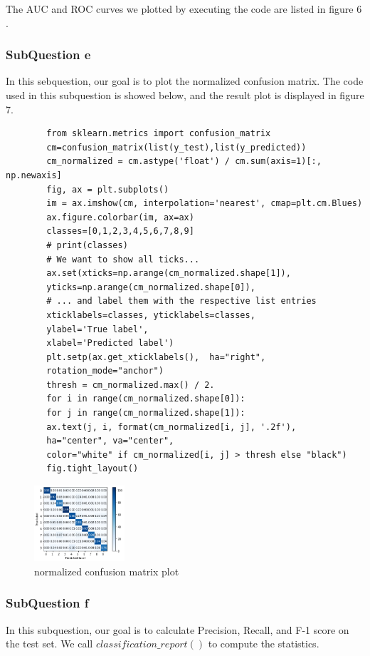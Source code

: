 \documentclass[conference]{IEEEtran}
\begin{document}
	The AUC and ROC curves we plotted by executing the code are listed in figure $6$.
	
	
	\subsubsection{SubQuestion e}
	In this sebquestion, our goal is to plot the normalized confusion matrix.
	The code used in this subquestion is showed below, and the result plot is displayed in figure 7.
	\begin{lstlisting}
		from sklearn.metrics import confusion_matrix
		cm=confusion_matrix(list(y_test),list(y_predicted))
		cm_normalized = cm.astype('float') / cm.sum(axis=1)[:, np.newaxis]
		fig, ax = plt.subplots()
		im = ax.imshow(cm, interpolation='nearest', cmap=plt.cm.Blues)
		ax.figure.colorbar(im, ax=ax)
		classes=[0,1,2,3,4,5,6,7,8,9]
		# print(classes)
		# We want to show all ticks...
		ax.set(xticks=np.arange(cm_normalized.shape[1]),
		yticks=np.arange(cm_normalized.shape[0]),
		# ... and label them with the respective list entries
		xticklabels=classes, yticklabels=classes,
		ylabel='True label',
		xlabel='Predicted label')
		plt.setp(ax.get_xticklabels(),  ha="right",
		rotation_mode="anchor")
		thresh = cm_normalized.max() / 2.
		for i in range(cm_normalized.shape[0]):
		for j in range(cm_normalized.shape[1]):
		ax.text(j, i, format(cm_normalized[i, j], '.2f'),
		ha="center", va="center",
		color="white" if cm_normalized[i, j] > thresh else "black")
		fig.tight_layout()
	\end{lstlisting}
	
	\begin{figure}[h] 
		\centering
		\includegraphics[width=0.3\textwidth]{T1Q3e.png}
		\caption{normalized confusion matrix plot}
		\label{Fig.t1q3e}
	\end{figure}
	\subsubsection{SubQuestion f}
	In this subquestion, our goal is to calculate Precision, Recall, and F-1 score on the test set. We call $classification\_report()$ to compute the statistics. \par
	
\end{document}
